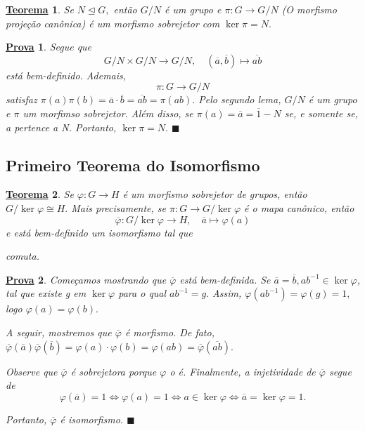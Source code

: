 \documentclass{article}
\newtheorem*{theorem*}{\underline{Teorema}}
\newtheorem*{proof*}{\underline{Prova}}
\renewcommand\qedsymbol{$\blacksquare$}
\begin{document}
\begin{theorem*}
  Se $N\trianglelefteq{G},$ ent\~ao $G/N$ \'e um grupo e $\pi:G\rightarrow G/N$ (O morfismo proje\c c\~ao can\^onica) \'e um morfismo
  sobrejetor com $\ker{\pi}=N.$
\end{theorem*}
\begin{proof*}
  Segue que 
    $$
      G/N\times G/N\rightarrow G/N,\quad (\overline{a}, \overline{b})\mapsto \overline{ab}
    $$
  est\'a bem-definido. Ademais, 
    $$
      \pi:G\rightarrow G/N
    $$
    satisfaz $\pi(a)\pi(b) = \overline{a}\cdot \overline{b}=\overline{ab}=\pi(ab).$ Pelo segundo lema, $G/N$ \'e um grupo
    e $\pi$ um morfimso sobrejetor. Al\'em disso, se $\pi(a) = \overline{a} = \overline{1} - N$ se, e somente se, a pertence a N.
    Portanto, $\ker{\pi} = N.$ \qedsymbol
\end{proof*}
\subsection{Primeiro Teorema do Isomorfismo}
\begin{theorem*}
  Se $\varphi:G\rightarrow H$ \'e um morfismo sobrejetor de grupos, ent\~ao $G/\ker{\varphi}\cong H.$ Mais precisamente, se 
  $\pi:G\rightarrow G/\ker{\varphi}$ \'e o mapa can\^onico, ent\~ao 
    $$
    \overline{\varphi}:G/\ker{\varphi}\rightarrow H,\quad \overline{a}\mapsto \varphi(a)
    $$
    e est\'a bem-definido um isomorfismo tal que 

  \begin{center}
  \end{center}
  comuta.
\end{theorem*}
\begin{proof*}
  Come\c camos mostrando que $\overline{\varphi}$ est\'a bem-definida. Se $\overline{a}=\overline{b}, ab^{-1}\in\ker{\varphi}$, tal que
  existe g em $\ker{\varphi}$ para o qual $ab^{-1}=g.$ Assim, $\varphi(ab^{-1})=\varphi(g)=1,$ logo $\varphi(a)=\varphi(b).$

  A seguir, mostremos que $\overline{\varphi}$ \'e morfismo. De fato, $\overline{\varphi}(\overline{a})\overline{\varphi}(\overline{b}) 
  = \varphi(a)\cdot \varphi(b) = \varphi(ab)=\overline{\varphi}(\overline{ab}).$

  Observe que $\overline{\varphi}$ \'e sobrejetora porque $\varphi$ o \'e. Finalmente, a injetividade de $\overline{\varphi}$ segue de 
  $$
    \varphi(\overline{a})=1 \Longleftrightarrow \varphi(a)=1 \Longleftrightarrow a\in\ker{\varphi} \Longleftrightarrow \overline{a}=\ker{\varphi} = 1.
  $$
  
  Portanto, $\overline{\varphi}$ \'e isomorfismo. \qedsymbol
\end{proof*}
\end{document}
